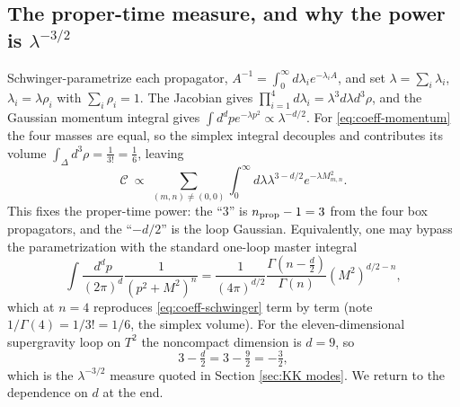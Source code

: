 \subsection*{The proper-time measure, and why the power is $\lambda^{-3/2}$}
Schwinger-parametrize each propagator, $A^{-1}=\int_0^\infty d\lambda_i e^{-\lambda_i A}$, and set $\lambda=\sum_i\lambda_i$, $\lambda_i=\lambda\rho_i$ with $\sum_i\rho_i=1$.
The Jacobian gives $\prod_{i=1}^4 d\lambda_i=\lambda^{3} d\lambda d^3\rho$, and the Gaussian momentum integral gives $\int d^dp e^{-\lambda p^2}\propto\lambda^{-d/2}$.
For \eqref{eq:coeff-momentum} the four masses are equal, so the simplex integral decouples and contributes its volume $\int_{\Delta}d^3\rho=\tfrac{1}{3!}=\tfrac16$, leaving
\begin{equation}
\mathcal{C}\ \propto\ \sum_{(m,n)\neq(0,0)}\int_{0}^{\infty} d\lambda \lambda^{ 3-d/2} e^{-\lambda M_{m,n}^2}.
\label{eq:coeff-schwinger}
\end{equation}
This fixes the proper-time power: the ``$3$'' is $n_{\rm prop}-1=3$ from the four box propagators, and the ``$-d/2$'' is the loop Gaussian.
Equivalently, one may bypass the parametrization with the standard one-loop master integral
\begin{equation}
\int\frac{d^dp}{(2\pi)^d}\frac{1}{(p^2+M^2)^{n}}
=\frac{1}{(4\pi)^{d/2}}\frac{\Gamma\left(n-\tfrac{d}{2}\right)}{\Gamma(n)} (M^2)^{ d/2-n},
\label{eq:master}
\end{equation}
which at $n=4$ reproduces \eqref{eq:coeff-schwinger} term by term (note $1/\Gamma(4)=1/3!=1/6$, the simplex volume).
For the eleven-dimensional supergravity loop on $T^2$ the noncompact dimension is $d=9$, so
\begin{equation}
3-\tfrac{d}{2}=3-\tfrac{9}{2}=-\tfrac32,
\end{equation}
which is the $\lambda^{-3/2}$ measure quoted in Section \ref{sec:KK modes}.
We return to the dependence on $d$ at the end.

